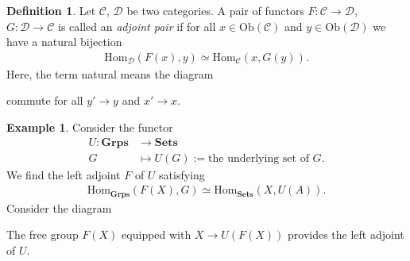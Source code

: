 \documentclass[12pt]{report}
\theoremstyle{plain}
\theoremstyle{remark}
\theoremstyle{definition}
\newtheorem{definition}[theorem]{Definition}
\newtheorem{example}[theorem]{Example}
\newcommand{\Hom}[3]{\mathrm{Hom}_{#3}(#1,#2)}
\begin{document}
\begin{definition}
    Let $\mathcal{C}$, $\mathcal{D}$ be two categories. A pair of functors $F:\mathcal{C}\rightarrow\mathcal{D}$, $G:\mathcal{D}\rightarrow\mathcal{C}$ is called an \emph{adjoint pair} if for all $x\in\mathrm{Ob}(\mathcal{C})$ and $y\in\mathrm{Ob}(\mathcal{D})$ we have a natural bijection
    \begin{align*}
        \Hom{F(x)}{y}{\mathcal{D}} \simeq \Hom{x}{G(y)}{\mathcal{C}}.
    \end{align*}
    Here, the term natural means the diagram
    \begin{figure}[H]
    \centering
    \end{figure}
    \noindent commute for all $y'\rightarrow y$ and $x'\rightarrow x$.
\end{definition}

\begin{example}
    Consider the functor
    \begin{align*}
        U:\mathbf{Grps} &\rightarrow \mathbf{Sets} \\
        G &\mapsto U(G) := \text{the underlying set of }G.
    \end{align*}
    We find the left adjoint $F$ of $U$ satisfying
    \begin{align*}
        \Hom{F(X)}{G}{\mathbf{Grps}} \simeq \Hom{X}{U(A)}{\mathbf{Sets}}.
    \end{align*}
    Consider the diagram
    \begin{figure}[H]
    \centering
    \end{figure}
    \noindent The free group $F(X)$ equipped with $X\rightarrow U(F(X))$ provides the left adjoint of $U$.
\end{example}
\end{document}
